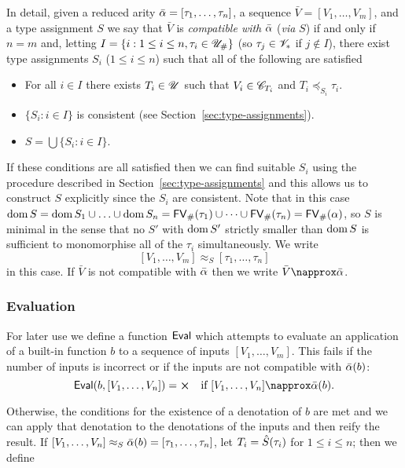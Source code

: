 \medskip
\noindent In detail, given a reduced arity $\bar{\alpha} = [\tau_1, \ldots,
  \tau_n]$, a sequence $\bar{V} = [V_1, \ldots, V_m]$, and a type assignment $S$
we say that $\bar{V}$ is \textit{compatible with} $\bar{\alpha}$ (\textit{via} $S$)
if and only if $n=m$ and, letting $I = \{i: 1 \leq i \leq n, \tau_i \in
{\mathscr{U}_{\#}}\}$ (so $\tau_j \in \mathscr{V}_*$ if $j \notin I$), there exist type
assignments $S_i$ ($1 \leq i \leq n$) such that all of the following are
satisfied
\begin{itemize}
\item For all $i \in I$ there exists $T_i \in \mathscr{U}$ such that $V_i \in \mathscr{C}_{T_i}$ and $T_i \preceq_{S_i} \tau_i$.
\item $\{S_i: i \in I\}$ is consistent (see Section~\ref{sec:type-assignments}).
\item $S = \bigcup\{S_i: i \in I\}$.
\end{itemize}

\noindent If these conditions are all satisfied then we can find suitable $S_i$
using the procedure described in Section~\ref{sec:type-assignments} and this
allows us to construct $S$ explicitly since the $S_i$ are consistent.  Note that
in this case $\operatorname{dom} S = \operatorname{dom} S_1 \cup \ldots \cup \operatorname{dom} S_n = \mathsf{FV}_{\#}(\tau_1) \cup
\cdots \cup \mathsf{FV}_{\#}(\tau_n) = \mathsf{FV}_{\#}(\alpha)$, so $S$ is minimal in the sense that no
$S'$ with $\operatorname{dom} S'$ strictly smaller than $\operatorname{dom} S$ is sufficient
to monomorphise all of the $\tau_i$ simultaneously.  We write
$$
[V_1, \ldots, V_m] \approx_S [\tau_1, \ldots, \tau_n]
$$
in this case.  If $\bar{V}$ is not compatible with $\bar{\alpha}$ then we write
$\bar{V} \napprox \alphabar$.%

\subsubsection{Evaluation}
\label{sec:eval}
For later use we define a function $\mathsf{Eval}$ which attempts to evaluate an
application of a built-in function $b$ to a sequence of inputs $[V_1, \ldots,
  V_m]$.  This fails if the number of inputs is incorrect or if the inputs are
not compatible with $\bar{\alpha}(b)$:
$$
\Eval(b,[V_1, \ldots, V_n]) = \errorX \quad \text{if $[V_1, \ldots, V_n] \napprox \alphabar(b)$}.
$$

\noindent Otherwise, the conditions for the existence of a denotation of $b$ are
met and we can apply that denotation to the denotations of the inputs and then
reify the result. If $[V_1, \ldots, V_n] \approx_S \bar{\alpha}(b) = [\tau_1,
  \ldots, \tau_n]$, let $T_i = \hat{S}(\tau_i)$ for $1 \leq i \leq n$; then we
define

